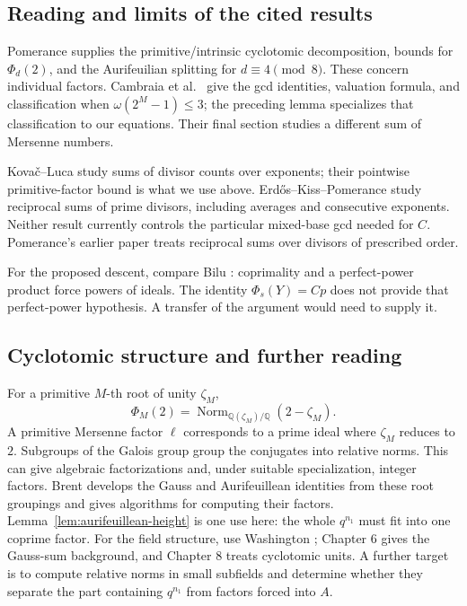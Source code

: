 \documentclass[11pt]{article}
\begin{document}
\subsection{Reading and limits of the cited results}
Pomerance \cite[\S2]{PomCycl} supplies the primitive/intrinsic
cyclotomic decomposition, bounds for $\Phi_d(2)$, and the Aurifeuilian
splitting for $d\equiv4\pmod8$. These concern individual factors.
Cambraia et al.\ \cite[\S\S2--4]{Cambraia} give the gcd identities,
valuation formula, and classification when $\omega(2^M-1)\leq3$;
the preceding lemma specializes that classification to our equations.
Their final section studies a different sum of Mersenne numbers.

Kova\v{c}--Luca \cite{KL} study sums of divisor counts over exponents;
their pointwise primitive-factor bound is what we use above.
Erd\H{o}s--Kiss--Pomerance \cite{EKP} study reciprocal sums of prime
divisors, including averages and consecutive exponents. Neither result
currently controls the particular mixed-base gcd needed for $C$.
Pomerance's earlier paper \cite{PomPrim} treats reciprocal sums over
divisors of prescribed order.

For the proposed descent, compare Bilu \cite[\S2, Proposition 2.1 and
Corollary 2.2]{Bilu}: coprimality and a perfect-power product force powers
of ideals. The identity $\Phi_s(Y)=Cp$ does not provide that
perfect-power hypothesis. A transfer of the argument would need to
supply it.

\subsection{Cyclotomic structure and further reading}
For a primitive $M$-th root of unity $\zeta_M$,
\[
\Phi_M(2)=\operatorname{Norm}_{\mathbb Q(\zeta_M)/\mathbb Q}(2-\zeta_M).
\]
A primitive Mersenne factor $\ell$ corresponds to a prime ideal
where $\zeta_M$ reduces to $2$. Subgroups of the Galois group group
the conjugates into relative norms. This can give algebraic
factorizations and, under suitable specialization, integer factors.
Brent \cite[\S\S2.2--2.3,3,4.4]{Brent} develops the Gauss and
Aurifeuillean identities from these root groupings and gives algorithms
for computing their factors. Lemma~\ref{lem:aurifeuillean-height}
is one use here: the whole $q^{n_1}$ must fit into one coprime factor.
For the field structure, use Washington \cite[Chapters 2--3]{Washington};
Chapter 6 gives the Gauss-sum background, and Chapter 8 treats
cyclotomic units. A further target is to compute relative norms in
small subfields and determine whether they separate the part containing
$q^{n_1}$ from factors forced into $A$.
\end{document}
